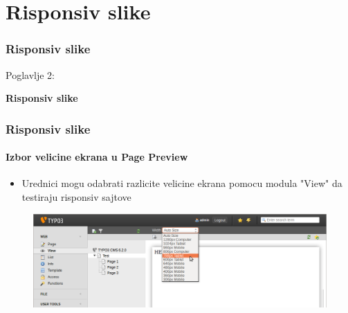 %

\section{Risponsiv slike}
\begin{frame}[fragile]
	\frametitle{Risponsiv slike}

	\begin{center}\huge{Poglavlje 2:}\end{center}
	\begin{center}\huge{\color{typo3darkgrey}\textbf{Risponsiv slike}}\end{center}

\end{frame}


\begin{frame}[fragile]
	\frametitle{Risponsiv slike}
	\framesubtitle{Izbor velicine ekrana u Page Preview}

	\begin{itemize}
		\item Urednici mogu odabrati razlicite velicine ekrana pomocu modula "View" da testiraju risponsiv sajtove
	\end{itemize}

	\begin{figure}
		\includegraphics[width=0.95\linewidth]{Images/ResponsiveImages/ScreenSizeInPagePreview.png}
	\end{figure}

\end{frame}

